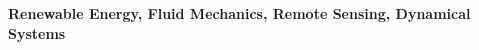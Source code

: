 \documentclass[10pt,ragged2e,a4paper,academicons]{altacv}
\begin{document}


\personalinfo{}%
  

\begin{fullwidth}
\makecvheader
\vspace{-1em}
\textbf{Renewable Energy, Fluid Mechanics, Remote Sensing, Dynamical Systems}
\end{fullwidth}



\end{document}
